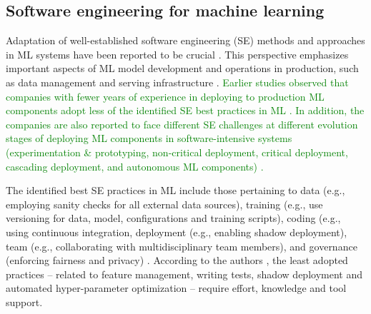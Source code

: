 
\subsection{Software engineering for machine learning}
Adaptation of well-established software engineering (SE) methods and approaches in ML systems have been reported to be crucial \cite{Amershi2019}. This perspective emphasizes important aspects of ML model development and operations in production, such as data management and serving infrastructure \cite{Sculley2015}. \textcolor{green}{Earlier studies observed that companies with fewer years of experience in deploying to production ML components adopt less of the identified SE best practices in ML \cite{Serban2020Practices}. In addition, the companies are also reported to face different SE challenges at different evolution stages of deploying ML components in software-intensive systems (experimentation & prototyping, non-critical deployment, critical deployment, cascading deployment, and autonomous ML components) \cite{Lwakatare2019}.}


The identified best SE practices in ML include those pertaining to data (e.g., employing sanity checks for all external data sources), training (e.g., use versioning for data, model, configurations and training scripts), coding (e.g., using continuous integration, deployment (e.g., enabling shadow deployment), team (e.g., collaborating with multidisciplinary team members), and governance (enforcing fairness and privacy) \cite{Serban2020Practices}. According to the authors \cite{Serban2020Practices}, the least adopted practices --  related to feature management, writing tests, shadow deployment and automated hyper-parameter optimization -- require effort, knowledge and tool support. 


